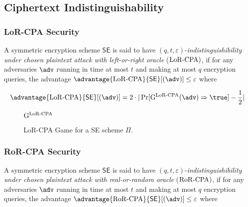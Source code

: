 \subsection{Ciphertext Indistinguishability}
\subsubsection{LoR-CPA Security}
A symmetric encryption scheme  $\textsf{SE}$ is said to have $(q,t,\varepsilon)$-\textit{indistinguishibility under chosen plaintext attack with left-or-right oracle} ($\mathrm{LoR\textrm-CPA})$, if for any adversaries $\adv$ running in time at most $t$ and making at most $q$ encryption queries, the advantage $\advantage{\lorcpa}{\textsf{SE}}[(\adv)] \leq \varepsilon$ where 

$$
\advantage{\lorcpa}{\textsf{SE}}[(\adv)] = 2 \cdot | \Pr[\mathrm{G}^{\lorcpa}(\adv) \Rightarrow \true ] - \frac{1}{2} | 
$$ 


\begin{figure}[h]
\centering
\begin{codeframe}[colback = white, width=9.5cm, height=4.75cm]{$\mathrm{G}^{\mathrm{LoR\textrm-CPA}}$}

\begin{pchstack}[space=0.5cm]
\begin{pcvstack}[space=0.3cm]

\end{pcvstack}
\end{pchstack}
\end{codeframe}
\caption{LoR-CPA Game for a \textsf{SE} scheme $\Pi$. }
\label{fig:lorcpa-game}
\end{figure}



\subsubsection{RoR-CPA Security}
A symmetric encryption scheme  $\textsf{SE}$ is said to have $(q,t,\varepsilon)$-\textit{indistinguishibility under chosen plaintext attack with real-or-random oracle} ($\mathrm{RoR\textrm-CPA})$, if for any adversaries $\adv$ running in time at most $t$ and making at most $q$ encryption queries, the advantage $\advantage{\rorcpa}{\textsf{SE}}[(\adv)] \leq \varepsilon$ where 

